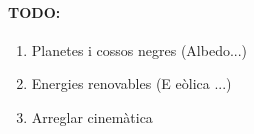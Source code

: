 \paragraph{TODO:}
\label{sec:todo}

\begin{enumerate}
    \item Planetes i cossos negres (Albedo...)
    \item Energies renovables (E eòlica ...)
    \item Arreglar cinemàtica
\end{enumerate}


